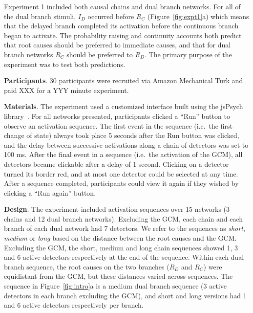 \documentclass[10pt,letterpaper]{article}
\newcommand{\ev}[2]{$#1_#2$}
\begin{document}
Experiment 1 included both causal chains and dual branch networks. For all of the dual branch stimuli, \ev{I}{D} occurred before \ev{R}{C} (Figure~\ref{fig:expt1}a) which means that the delayed branch completed its activation before the continuous branch began to activate. The probability raising and continuity accounts both predict that root causes should be preferred to immediate causes, and that for dual branch networks \ev{R}{C} should be preferred to \ev{R}{D}. The primary purpose of the experiment was to test both predictions. 

\textbf{Participants}. 30 participants were recruited via Amazon Mechanical Turk and paid XXX for a YYY minute experiment.



\textbf{Materials}. The experiment used a customized interface built using the jsPsych library~\cite{XXX}. For all networks presented, participants clicked a ``Run'' button to observe an activation sequence. The first event in the sequence (i.e.\ the first change of state) always took place 5 seconds after the Run button was clicked, and the delay between successive activations along a chain of detectors was set to 100 ms. After the final event in a sequence (i.e.\ the activation of the GCM), all detectors became clickable after a delay of 1 second. Clicking on a detector turned its border red, and at most one detector could be selected at any time. After a sequence completed, participants could view it again if they wished by clicking a ``Run again'' button.

\textbf{Design}.  The experiment included activation sequences over 15 networks (3 chains and 12 dual branch networks). Excluding the GCM, each chain and each branch of each dual network had 7 detectors. We refer to the sequences as \emph{short}, \emph{medium} or \emph{long} based on the distance between the root causes and the GCM. Excluding the GCM, the short, medium and long chain sequences showed 1, 3 and 6 active detectors respectively at the end of the sequence. Within each dual branch sequence, the root causes on the two branches (\ev{R}{D} and \ev{R}{C}) were equidistant from the GCM, but these distances varied across sequences. The sequence in Figure~\ref{fig:intro}a is a medium dual branch sequence (3 active detectors in each branch excluding the GCM), and short and long versions had 1 and 6 active detectors respectively per branch.
\end{document}
